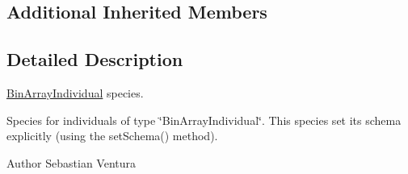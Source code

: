 \subsection*{Additional Inherited Members}


\subsection{Detailed Description}
\hyperlink{classnet_1_1sf_1_1jclec_1_1binarray_1_1_bin_array_individual}{Bin\-Array\-Individual} species.

Species for individuals of type \char`\"{}\-Bin\-Array\-Individual\char`\"{}. This species set its schema explicitly (using the set\-Schema() method).

\begin{DoxyAuthor}{Author}
Sebastian Ventura 
\end{DoxyAuthor}


